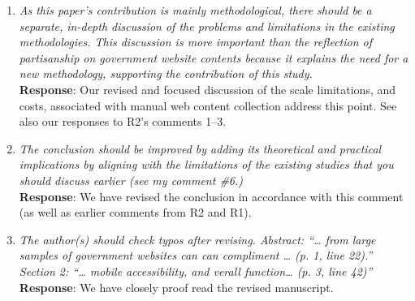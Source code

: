 \documentclass[12pt,titlepage]{article}
\begin{document}
\begin{enumerate}
    \item \emph{As this paper’s contribution is mainly methodological, there should be a separate, in-depth discussion of the problems and limitations in the existing methodologies. This discussion is more important than the reflection of partisanship on government website contents because it explains the need for a new methodology, supporting the contribution of this study.}\\

    \textbf{Response}:  Our revised and focused discussion of the scale limitations, and costs, associated with manual web content collection address this point. See also our responses to R2's comments 1--3.
    
        \item \emph{The conclusion should be improved by adding its theoretical and practical implications by aligning with the limitations of the existing studies that you should discuss earlier (see my comment \#6.)}\\

    \textbf{Response}:  We have revised the conclusion in accordance with this comment (as well as earlier comments from R2 and R1). 
    
    
            \item \emph{The author(s) should check typos after revising. Abstract: “… from large samples of government websites can can compliment … (p. 1, line 22).” Section 2: “… mobile accessibility, and verall function… (p. 3, line 42)”}\\

    \textbf{Response}: We have closely proof read the revised manuscript.


    

\end{enumerate}





\newpage
\singlespacing
%
% 
\end{document}
